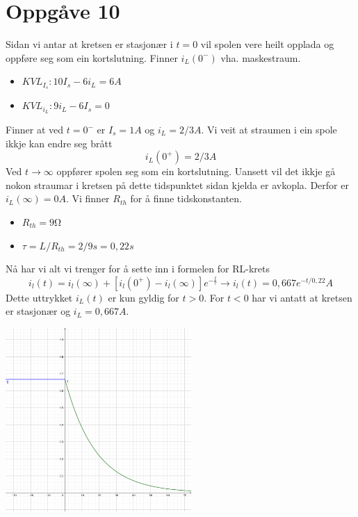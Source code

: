 \documentclass[12pt,a4paper]{article}
\begin{document}
    \section{Oppgåve 10}
      Sidan vi antar at kretsen er stasjonær i $t=0$ vil spolen vere heilt opplada
      og oppføre seg som ein kortslutning. Finner $i_L(0^-)$ vha. maskestraum.
      \begin{itemize}
        \item $KVL_{I_s}: 10I_s - 6i_L = 6A$
        \item $KVL_{i_L}: 9i_L -  6I_s = 0$
      \end{itemize}
      Finner at ved $t=0^-$ er $I_s = 1A$ og $i_L = 2/3A$. Vi veit at straumen i ein
      spole ikkje kan endre seg brått
      \begin{equation}
        i_L(0^+) = 2/3A
      \end{equation}
      Ved $t \rightarrow \infty$ oppfører spolen seg som ein kortslutning. Uansett
      vil det ikkje gå nokon straumar i kretsen på dette tidspunktet sidan kjelda er
      avkopla. Derfor er $i_L(\infty) = 0A$. Vi finner $R_{th}$ for å finne
      tidskonstanten.
      \begin{itemize}
        \item $R_{th} = 9\si{\ohm}$
        \item $\tau = L/R_{th} = 2/9s = 0,22s$
      \end{itemize}
      Nå har vi alt vi trenger for å sette inn i formelen for RL-krets
      \begin{equation}
        i_l(t)=i_l(\infty) + \left[ i_l(0^+)-i_l(\infty)\right] e^{-\frac{t}{\tau}}
        \rightarrow i_l(t) = 0,667e^{-t/0,22}A
      \end{equation}
      Dette uttrykket $i_L(t)$ er kun gyldig for $t>0$. For $t<0$ har vi antatt at
      kretsen er stasjonær og $i_L = 0,667A$.
      \begin{center}
        \includegraphics[width=200pt]{06_10.png}
      \end{center}
\end{document}
